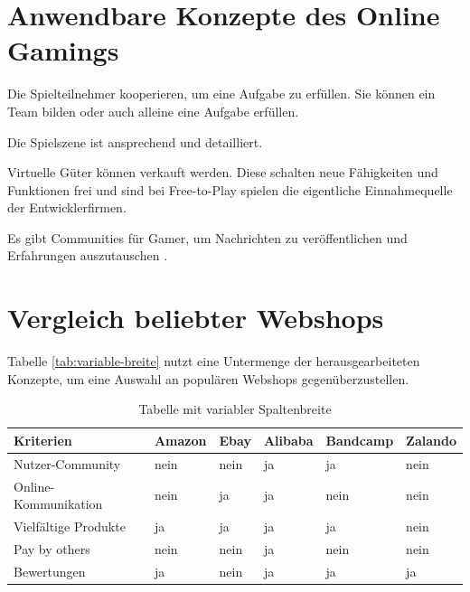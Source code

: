 \section{Anwendbare Konzepte des Online Gamings}

Die Spielteilnehmer kooperieren, um eine Aufgabe zu erfüllen. Sie können ein Team bilden oder auch alleine eine Aufgabe erfüllen.

Die Spielszene ist ansprechend und detailliert.

Virtuelle Güter können verkauft werden. Diese schalten neue Fähigkeiten und Funktionen frei und sind bei Free-to-Play spielen die eigentliche Einnahmequelle der Entwicklerfirmen.

Es gibt Communities für Gamer, um Nachrichten zu veröffentlichen und Erfahrungen auszutauschen \parencite[S. 126]{warmelink}.


\section{Vergleich beliebter Webshops}

Tabelle \vref{tab:variable-breite} nutzt eine Untermenge der herausgearbeiteten Konzepte, um eine Auswahl an populären Webshops gegenüberzustellen.

\begin{table}[htbp]
\centering
\begin{tabular}{l l l l l l}
\toprule
Kriterien				& Amazon	& Ebay	& Alibaba	& Bandcamp	& Zalando\\
\midrule
Nutzer-Community		& nein		& nein	& ja		& ja		& nein\\
Online-Kommunikation	& nein		& ja	& ja		& nein		& nein\\
Vielfältige Produkte	& ja		& ja	& ja		& ja		& nein\\
Pay by others			& nein		& nein	& ja		& nein		& nein\\
Bewertungen				& ja		& nein	& ja		& ja		& ja\\
\bottomrule
\end{tabular}
\caption{Tabelle mit variabler Spaltenbreite}
\label{tab:variable-breite}
\end{table}
